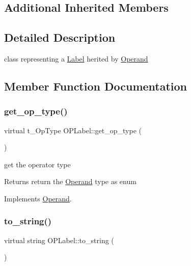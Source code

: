\subsection*{Additional Inherited Members}


\subsection{Detailed Description}
class representing a \mbox{\hyperlink{class_label}{Label}} herited by \mbox{\hyperlink{class_operand}{Operand}} 

\subsection{Member Function Documentation}
\mbox{\label{class_o_p_label_a1a6ec701c549a6475d44ffcced1c23b5}} 
\subsubsection{\texorpdfstring{get\+\_\+op\+\_\+type()}{get\_op\_type()}}
{\footnotesize\ttfamily virtual t\+\_\+\+Op\+Type O\+P\+Label\+::get\+\_\+op\+\_\+type (\begin{DoxyParamCaption}{ }\end{DoxyParamCaption})\hspace{0.3cm}{\ttfamily [virtual]}}



get the operator type 

\begin{DoxyReturn}{Returns}
return the \mbox{\hyperlink{class_operand}{Operand}} type as enum 
\end{DoxyReturn}


Implements \mbox{\hyperlink{class_operand_afd469e305a467e2574f34ac9bd6c62b0}{Operand}}.

\mbox{\label{class_o_p_label_a51c4e8f45422f03edcb71d472cf5e973}} 
\subsubsection{\texorpdfstring{to\+\_\+string()}{to\_string()}}
{\footnotesize\ttfamily virtual string O\+P\+Label\+::to\+\_\+string (\begin{DoxyParamCaption}{ }\end{DoxyParamCaption})\hspace{0.3cm}{\ttfamily [virtual]}}



